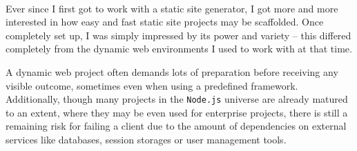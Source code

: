 \paragraph{} %
Ever since I first got to work with a static site generator, I got more and more interested in how easy and fast static site projects may be scaffolded. Once completely set up, I was simply impressed by its power and variety -- this differed completely from the dynamic web environments I used to work with at that time.

A dynamic web project often demands lots of preparation before receiving any visible outcome, sometimes even when using a predefined framework. Additionally, though many projects in the \texttt{Node.js} universe are already matured to an extent, where they may be even used for enterprise projects, there is still a remaining risk for failing a client due to the amount of dependencies on external services like databases, session storages or user management tools.




